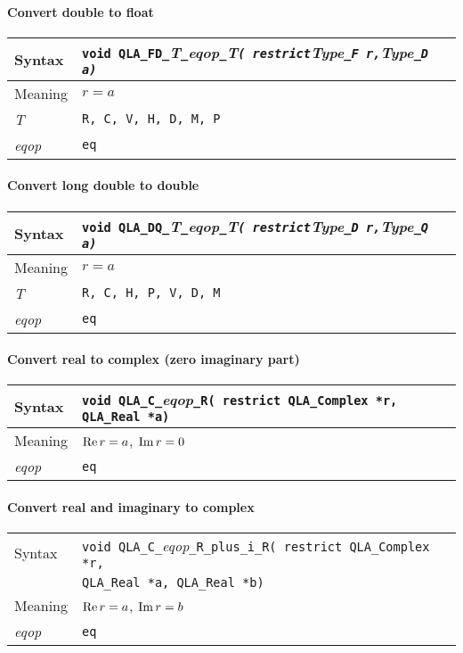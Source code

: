 \documentclass{article}
\renewcommand{\Re}{\mathop{\rm Re}}
\renewcommand{\Im}{\mathop{\rm Im}}
\newcommand{\tReal}{QLA\ttdash Real }
\newcommand{\tComplex}{QLA\ttdash Complex }
\newcommand{\namespace}{QLA}
\newcommand{\ttdash}{{\tt \_}}
\newcommand{\itt}{\it T}
\newcommand{\extraarg}{}
\newcommand{\protoUnarySingleTypesCR}{{\tt void \namespace}\ttdash{\tt C}\ttdash{\it eqop}\ttdash{\tt R}{\tt ( restrict \tComplex *r, \tReal *a\extraarg)}}
\newcommand{\longdoubletodouble}{
\paragraph{Convert long double to double}
\begin{flushleft}
  \begin{tabular}{|l|l|}
  \hline
  Syntax      & {\tt void \namespace}\ttdash {\tt DQ}\ttdash\itt\ttdash{\it eqop}\ttdash\itt{\tt ( restrict}{\it Type}{\tt \_D }{\tt *r,}{\it Type}{\tt \_Q }{\tt *a\extraarg)} \\
  \hline
  Meaning     & $r = a$ \\
  \hline
  \itt     & {\tt R, C, H, P, V, D, M} \\
  \hline
  {\it eqop}  & {\tt eq} \\
  \hline
  \end{tabular}
\end{flushleft}
}
\begin{document}
\paragraph{Convert double to float}
\begin{flushleft}
  \begin{tabular}{|l|l|}
  \hline
  Syntax      & {\tt void \namespace}\ttdash {\tt FD}\ttdash\itt\ttdash{\it eqop}\ttdash\itt{\tt ( restrict}{\it Type}{\tt \_F }{\tt *r,}{\it Type}{\tt \_D }{\tt *a\extraarg)} \\
  \hline
  Meaning     & $r = a$ \\
  \hline
  \itt     & {\tt R, C, V, H, D, M, P} \\
  \hline
  {\it eqop}  & {\tt eq} \\
  \hline
  \end{tabular}
\end{flushleft}

\longdoubletodouble

\paragraph{Convert real to complex (zero imaginary part)}

\begin{flushleft}
  \begin{tabular}{|l|l|}
  \hline
  Syntax      & \protoUnarySingleTypesCR \\
  \hline
  Meaning     & $\Re r = a$, $\Im r = 0$ \\
  \hline
  {\it eqop}  & {\tt eq} \\
  \hline
  \end{tabular}
\end{flushleft}

\paragraph{Convert real and imaginary to complex}

\begin{flushleft}
  \begin{tabular}{|l|l|}
  \hline
  Syntax      & {\tt void \namespace}\ttdash{\tt C}\ttdash{\it eqop}\ttdash{\tt R\_plus\_i\_R( restrict \tComplex *r,}\\
              & {\tt \tReal *a, \tReal *b\extraarg)} \\
  \hline
  Meaning     & $\Re r = a$, $\Im r = b$ \\
  \hline
  {\it eqop}  & {\tt eq} \\
  \hline
  \end{tabular}
\end{flushleft}
\end{document}

